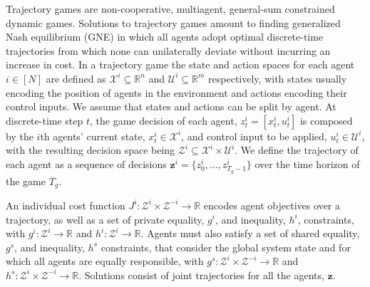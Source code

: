 Trajectory games are non-cooperative, multiagent,
general-sum constrained dynamic games.
Solutions to trajectory games amount to finding
generalized Nash equilibrium (GNE) in which all agents
adopt optimal discrete-time trajectories from which
none can unilaterally deviate without incurring an increase in cost.
In a trajectory game the state and action spaces for each agent \(i \in [N]\) are
defined as \(\mathcal{X}^i \subseteq \mathbb{R}^n\)
and \(\mathcal{U}^i \subseteq \mathbb{R}^m\) respectively,
with states usually encoding the position
of agents in the environment
and actions encoding their control inputs.
We assume that states and actions can be split by agent.
At discrete-time step \(t\), the game decision
of each agent, \(z_t^i = [x_t^i, u_t^i]\)
is composed by the \(i\text{th}\) agents' current state, \(x_t^i \in \mathcal{X}^i\),
and control input to be applied, \(u_t^i \in \mathcal{U}^i\), with the resulting
decision space being \(\mathcal{Z}^i \subseteq \mathcal{X}^i \times \mathcal{U}^i\).
We define the trajectory of each agent
as a sequence of decisions \(\mathbf{z}^i = \{z_0^i, \dots, z_{T_g-1}^i\}\)
over the time horizon of the game \(T_g\).

An individual cost function \(J^i \colon \mathcal{Z}^{i} \times \mathcal{Z}^{-i}  \to \mathbb{R}\)
encodes agent objectives over a trajectory,
as well as a set of private equality, \(g^i\),
and inequality, \(h^i\), constraints, with \(g^i \colon \mathcal{Z}^{i} \to \mathbb{R}\)
and \(h^i \colon \mathcal{Z}^{i} \to \mathbb{R}\).
Agents must also satisfy a set of shared equality, \(g^s\),
and inequality, \(h^s\) constraints,
that consider the global system state and for which all agents are equally responsible,
with \(g^s \colon \mathcal{Z}^{i} \times \mathcal{Z}^{-i} \to \mathbb{R}\)
and \(h^s \colon \mathcal{Z}^{i} \times \mathcal{Z}^{-i} \to \mathbb{R}\).
Solutions consist
of joint trajectories
for all the agents, \(\mathbf{z}\).


